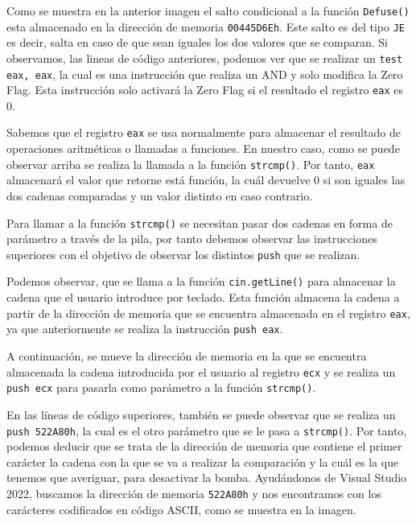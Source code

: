 \documentclass[11pt,a4paper]{article}
\begin{document}
Como se muestra en la anterior imagen el salto condicional a la función \texttt{Defuse()} esta almacenado 
en la dirección de memoria \texttt{00445D6Eh}. Este salto es del tipo \texttt{JE} es decir, salta en caso 
de que sean iguales los dos valores que se comparan. Si observamos, las lineas de código anteriores, 
podemos ver que se realizar un \texttt{test eax, eax}, la cual es una instrucción que realiza un AND y 
solo modifica la Zero Flag. Esta instrucción solo activará la Zero Flag si el resultado el registro \texttt{eax} es 0.
\vspace{2ex}

  Sabemos que el registro \texttt{eax} se usa 
normalmente para almacenar el resultado de operaciones aritméticas o llamadas a funciones. En nuestro caso, 
como se puede observar arriba se realiza la llamada a la función \texttt{strcmp()}. Por tanto,  
\texttt{eax} almacenará el valor que retorne está función, la cuál devuelve 0 si son iguales las dos cadenas comparadas y un valor distinto en caso contrario. 
\vspace{2ex}

Para llamar a la función \texttt{strcmp()} se necesitan pasar dos cadenas en forma de parámetro a través de la pila, 
por tanto debemos observar las instrucciones superiores con el objetivo de observar los distintos \texttt{push} que se realizan. 
\vspace{2ex}

Podemos observar, que se llama a la función \texttt{cin.getLine()} para almacenar la cadena 
que el usuario introduce por teclado. Esta función almacena la cadena a partir de la dirección de memoria 
que se encuentra almacenada en el registro \texttt{eax}, ya que anteriormente se realiza la instrucción \texttt{push eax}.
\vspace{2ex}

A continuación, se mueve la dirección de memoria en la que se encuentra almacenada la cadena introducida por el usuario 
al registro \texttt{ecx} y se realiza un \texttt{push ecx} para pasarla como parámetro a la función \texttt{strcmp()}. 
\vspace{2ex}

En las líneas de código superiores, también se puede observar que 
se realiza un \texttt{push 522A80h}, la cual es el otro parámetro que se le pasa a \texttt{strcmp()}. Por tanto, podemos deducir 
que se trata de la dirección de memoria que contiene el primer carácter la cadena con la que se va a realizar 
la comparación y la cuál es la que tenemos que averiguar, para desactivar la bomba. Ayudándonos de Visual Studio 2022, 
buscamos la dirección de memoria \texttt{522A80h} y nos encontramos con los carácteres codificados en código ASCII, como se muestra en la imagen.
\end{document}
